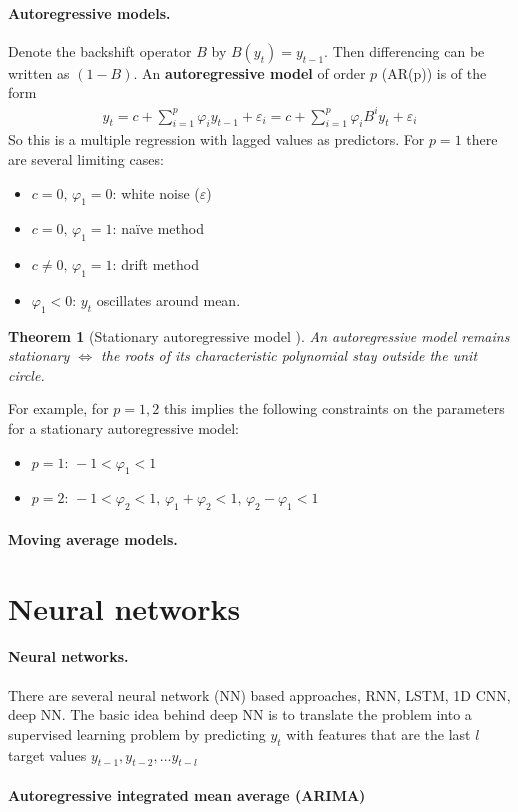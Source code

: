 \documentclass[12pt,a4paper]{article}
\newtheorem{theorem}{Theorem}
\begin{document}
\paragraph{Autoregressive models.}
Denote the backshift operator $B$ by $B(y_t) = y_{t-1}$. Then differencing can be written as $(1-B)$. An \textbf{autoregressive model }of order $p$ (AR(p)) is of the form
\begin{align}
	y_t = c + \sum_{i=1} ^p \varphi_i y_{t-1} + \varepsilon_i = c + \sum_{i=1} ^p \varphi_i B^i y_{t} + \varepsilon_i 
\end{align}
So this is a multiple regression with lagged values as predictors.
For $p=1$ there are several limiting cases:
\begin{itemize}
	\item $c = 0, \, \varphi_1 =0$: white noise ($\varepsilon$)
	\item $c = 0, \, \varphi_1 =1$: na\"ive method
	\item $c \neq 0, \, \varphi_1 =1$: drift method 
   \item $\varphi_1 < 0$:  $y_t$ oscillates around mean.
\end{itemize}
\begin{theorem}[Stationary autoregressive model \cite{boxjen_time_serie}]
	An autoregressive model remains stationary $\Leftrightarrow$ the roots of its characteristic polynomial stay outside the unit circle.
\end{theorem}
For example, for  $p=1,2$ this implies the following constraints on the parameters for a stationary autoregressive model:
\begin{itemize}
	\item $p=1: \, -1 < \varphi_1 <  1$ 
	\item $p=2:\, -1 < \varphi_2 <  1, \, \varphi_1 + \varphi_2 < 1, \, \varphi_2 - \varphi_1 < 1 $  
\end{itemize}


\paragraph{Moving average models.}

\section{Neural networks}
\paragraph{Neural networks.} There are several neural network (NN) based approaches, RNN, LSTM, 1D CNN, deep NN. The basic idea behind deep NN is to translate the problem into a supervised learning problem by predicting $y_t$ with features that are the last $l$ target values $y_{t-1}, y_{t-2},\dots y_{t-l}$ 



\paragraph{Autoregressive integrated mean average (ARIMA)}



\end{document}
